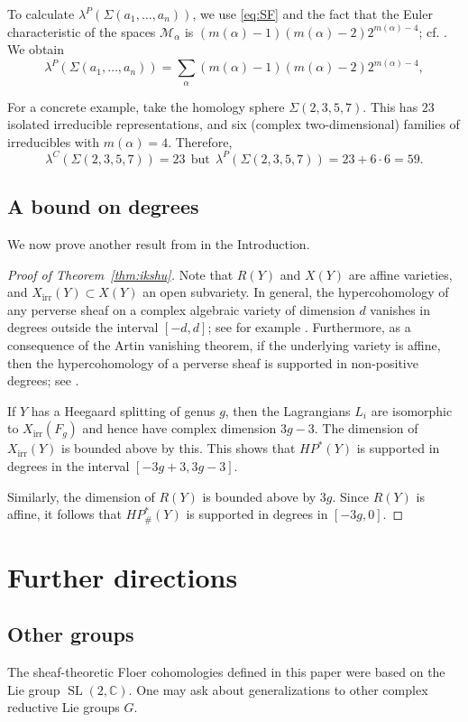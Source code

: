 \documentclass [11pt]{amsart}
\theoremstyle{remark}
\def\cc {{\mathbb{C}}}
\def\HP{\mathit{HP}}
\def\sl {{\operatorname{SL}(2, \cc)}}
\def\Rep {R}
\def\Char {X}
\def\CharIrr {\Char_{\operatorname{irr}}}
\def\HPf{\HP_{\! \#}}
\def\M{\mathcal{M}}
\begin{document}
To calculate $\lambda^P(\Sigma(a_1, \dots, a_n))$, we use \eqref{eq:SF} and the fact that the Euler characteristic of the spaces $\M_{\alpha}$ is $(m(\alpha)-1)(m(\alpha)-2)2^{m(\alpha)-4}$; cf. \cite{BodenYokogawa}. We obtain
$$\lambda^P(\Sigma(a_1, \dots, a_n)) = \sum_{\alpha} (m(\alpha)-1)(m(\alpha)-2)2^{m(\alpha)-4},$$

For a concrete example, take the homology sphere $\Sigma(2,3,5,7)$. This has $23$ isolated irreducible representations, and six (complex two-dimensional) families of irreducibles with $m(\alpha)=4$.  Therefore,
$$ \lambda^C(\Sigma(2,3,5,7)) = 23 \ \ \text{but} \ \
\lambda^P(\Sigma(2,3,5,7)) = 23 + 6 \cdot 6 = 59.$$

\subsection{A bound on degrees} We now prove another result from in the Introduction.

\begin{proof}[Proof of Theorem~\ref{thm:ikshu}]
Note that $\Rep(Y)$ and $\Char(Y)$ are affine varieties, and $\CharIrr(Y) \subset \Char(Y)$ an open subvariety. In general, the hypercohomology of any perverse sheaf on a complex algebraic variety of dimension $d$ vanishes in degrees outside the interval $[-d, d]$; see for example \cite[Proposition 5.2.20]{Dimca}. Furthermore, as a consequence of the Artin vanishing theorem, if the underlying variety is affine, then the hypercohomology of a perverse sheaf is supported in non-positive degrees; see \cite[Corollary 5.2.18]{Dimca}.

If $Y$ has a Heegaard splitting of genus $g$, then the Lagrangians $L_i$ are isomorphic to $\CharIrr(F_g)$ and hence have complex dimension $3g-3$. The dimension of $\CharIrr(Y)$ is bounded above by this. This shows that $\HP^*(Y)$ is supported in degrees in the interval $[-3g+3, 3g-3]$. 

Similarly,  the dimension of $\Rep(Y)$ is bounded above by $3g$. Since $\Rep(Y)$ is affine, it follows that $\HPf^*(Y)$ is supported in degrees in $[-3g, 0]$.
\end{proof}

\section{Further directions}
\label{sec:Further}

\subsection{Other groups}
\label{sec:otherG}
The sheaf-theoretic Floer cohomologies defined in this paper were based on the Lie group $\sl$. One may ask about generalizations to other complex reductive Lie groups $G$. 
\end{document}
